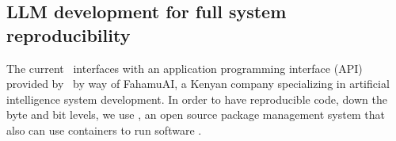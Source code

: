 \subsection{LLM development for full system reproducibility}
The current \project\ interfaces with an application programming interface (API) provided by \openai\ by way of FahamuAI, a Kenyan company specializing in artificial intelligence system development.
In order to have reproducible code, down the byte and bit levels, we use \guix, an open source package management system that also can use containers to run software \cite{Vallet:2022_guix}.